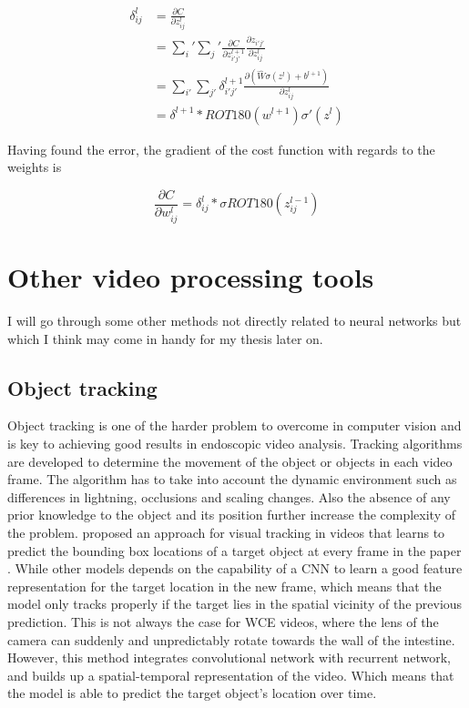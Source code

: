 \documentclass[english, a4paper]{report}
\begin{document}
\begin{equation}
  \begin{aligned}
  \delta_{ij}^l &= \frac{\partial C}{\partial z_{ij}^l} \\
  &= \sum_i' \sum_j' \frac{\partial C}{\partial z_{i'j'}^{l+1}}\frac{\partial z_{i'j'}}{\partial z_{ij}^l} \\
  &= \sum_{i'} \sum_{j'}\delta_{i'j'}^{l+1} \frac{\partial (\hat{W}\sigma(z^l) + b^{l+1})}{\partial z_{ij}^l} \\
  &= \delta^{l+1} * ROT180(w^{l+1})\sigma'(z^l)
  \end{aligned}
\end{equation}

Having found the error, the gradient of the cost function with regards to the weights is

\begin{equation} %
  \frac{\partial C}{\partial w_{ij}^l} = \delta_{ij}^l * \sigma{ROT180(z_{ij}^{l-1})}
\end{equation}



\section{Other video processing tools}
I will go through some other methods not directly related to neural networks but which I think may come in handy for my thesis later on. 

\subsection{Object tracking}
Object tracking is one of the harder problem to overcome in computer vision and is key to achieving good results in endoscopic video analysis. Tracking algorithms are developed to determine the movement of the object or objects in each video frame. The algorithm has to take into account the dynamic environment such as differences in lightning, occlusions and scaling changes. Also the absence of any prior knowledge to the object and its position further increase the complexity of the problem. \citeauthor*{DeepReinforcement17} proposed an approach for visual tracking in videos that learns to predict the bounding box locations of a target object at every frame in the paper  \cite{DeepReinforcement17}. While other models depends on the capability of a CNN to learn a good feature representation for the target location in the new frame, which means that the model only tracks properly if the target lies in the spatial vicinity of the previous prediction. This is not always the case for WCE videos, where the lens of the camera can suddenly and unpredictably rotate towards the wall of the intestine. However, this method integrates convolutional network with recurrent network, and builds up a spatial-temporal representation of the video. Which means that the model is able to predict the target object's location over time.
\end{document}
